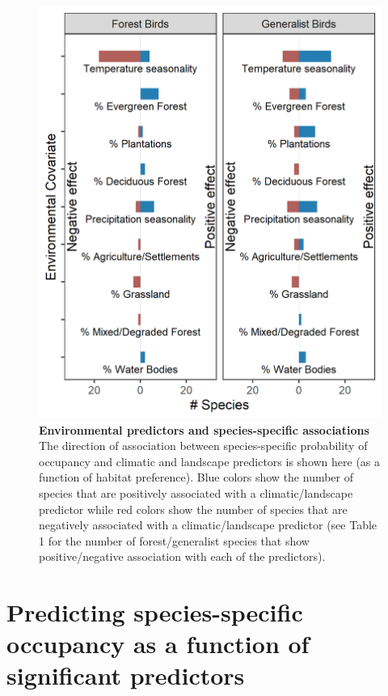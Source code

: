 \documentclass[
]{article}
\begin{document}
\begin{figure}
\centering
\includegraphics{figs/fig_04.png}
\caption{\textbf{Environmental predictors and species-specific associations}
The direction of association between species-specific probability of occupancy and climatic and landscape predictors is shown here (as a function of habitat preference). Blue colors show the number of species that are positively associated with a climatic/landscape predictor while red colors show the number of species that are negatively associated with a climatic/landscape predictor (see Table 1 for the number of forest/generalist species that show positive/negative association with each of the predictors).}
\end{figure}

\hypertarget{predicting-species-specific-occupancy-as-a-function-of-significant-predictors}{%
\section{Predicting species-specific occupancy as a function of significant predictors}\label{predicting-species-specific-occupancy-as-a-function-of-significant-predictors}}
\end{document}
